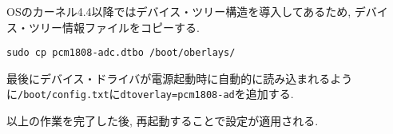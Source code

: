\begin{enumerate}
  OSのカーネル4.4以降ではデバイス・ツリー構造を導入してあるため, デバイス・ツリー情報ファイルをコピーする. 

\begin{lstlisting}[caption=デバイス・ツリー情報ファイルのコピーコマンド,label=device_tree]
sudo cp pcm1808-adc.dtbo /boot/oberlays/
\end{lstlisting}

  最後にデバイス・ドライバが電源起動時に自動的に読み込まれるように\texttt{/boot/config.txt}に\texttt{dtoverlay=pcm1808-ad}を追加する. 

  以上の作業を完了した後, 再起動することで設定が適用される. 
\end{enumerate}
